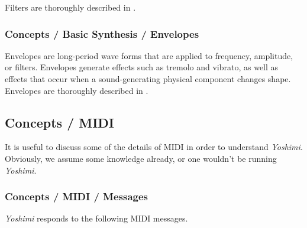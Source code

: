    Filters are thoroughly described in
   .

\subsubsection{Concepts / Basic Synthesis / Envelopes}
\label{subsubsec:concepts_basics_envelopes}

   Envelopes are long-period wave forms that are applied to frequency,
   amplitude, or filters.  Envelopes generate effects such as tremolo and
   vibrato, as well as effects that occur when a sound-generating physical
   component changes shape.
   Envelopes are thoroughly described in
   .

\subsection{Concepts / MIDI}
\label{subsec:concepts_midi}

   It is useful to discuss some of the details of MIDI in order
   to understand \textsl{Yoshimi}.  Obviously, we assume
   some knowledge already, or one wouldn't be running
   \textsl{Yoshimi}.

\subsubsection{Concepts / MIDI / Messages}
\label{subsubsec:concepts_midi_messages}

   \textsl{Yoshimi} responds to the following MIDI messages.

